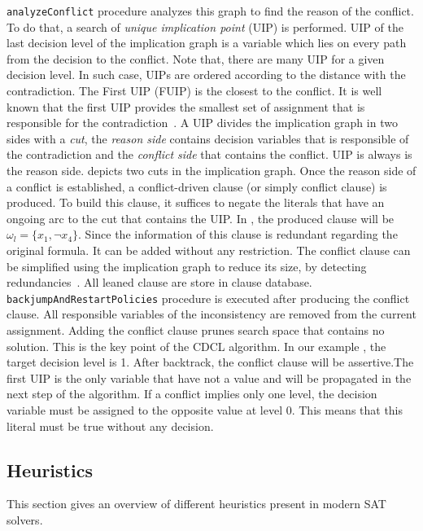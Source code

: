 \texttt{analyzeConflict} procedure analyzes this graph to find the reason of the conflict. To do that, a search of
\emph{unique implication point} (UIP) is performed. UIP of the last decision level of the implication graph is a variable
which lies on every path from the decision to the conflict. Note that, there are many UIP for a given decision level.
In such case, UIPs are ordered according to the distance with the contradiction. The First UIP (FUIP) is the closest to
the conflict. It is well known that the first UIP provides the smallest set of assignment that is responsible for the
contradiction~\cite{zhang2001efficient}.
A UIP divides the implication graph in two sides with a \emph{cut}, the \emph{reason side} contains decision variables 
that is responsible of the contradiction and the \emph{conflict side} that contains the conflict. 
 UIP is always is the 
reason side.  depicts two cuts in the implication graph.
Once the reason side of a conflict is established, a conflict-driven clause (or simply conflict clause) is produced.
To build this clause, it suffices to negate the
literals that have an ongoing arc to the  cut that contains the UIP. In , the produced
clause will be $\omega_l = \{x_1, \neg x_4 \}$. Since the information of this clause is redundant regarding 
the original formula. It can be added without any  restriction. The conflict clause can be simplified
using the implication graph to reduce its size, by detecting
redundancies~\cite{sorensson2009minimizing}. All leaned clause are store in clause database.
\texttt{backjumpAndRestartPolicies} procedure is executed after producing the conflict clause.
All responsible variables of the inconsistency are removed from the current assignment.
Adding the conflict clause prunes search space that contains no solution. This is the key point of the CDCL algorithm. In our example , the target decision level is 1.
After backtrack, the conflict clause will be assertive.The first UIP is the only variable that 
have not a value and will be propagated in the next step of the  algorithm.
If a conflict implies only one level, the decision variable must be assigned 
to the opposite value at level 0. This means that this literal must be true without any decision.
 
 
\subsection{Heuristics}\label{sec:heuristics}
This section gives an overview of different heuristics present in modern SAT solvers.

